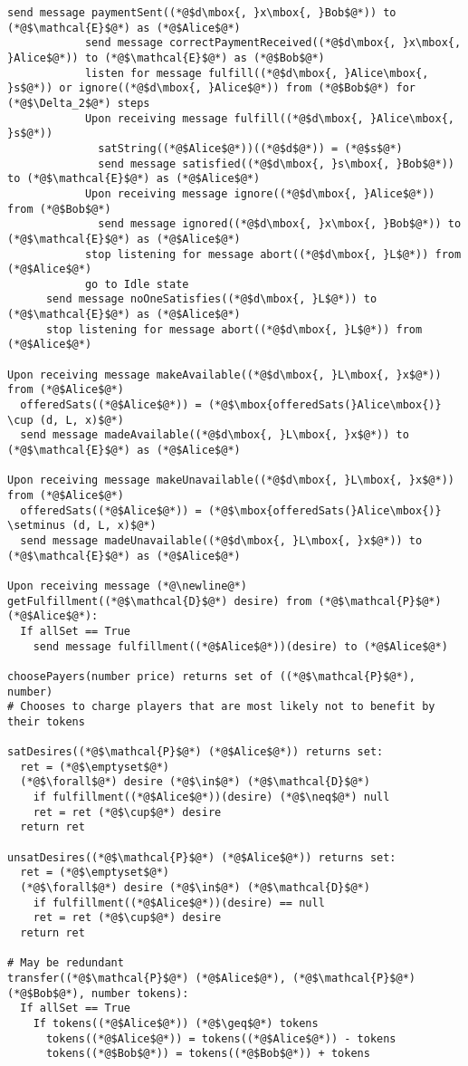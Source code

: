 \begin{lstlisting}[label=satfunc, style=numbers]
            send message paymentSent((*@$d\mbox{, }x\mbox{, }Bob$@*)) to (*@$\mathcal{E}$@*) as (*@$Alice$@*)
            send message correctPaymentReceived((*@$d\mbox{, }x\mbox{, }Alice$@*)) to (*@$\mathcal{E}$@*) as (*@$Bob$@*)
            listen for message fulfill((*@$d\mbox{, }Alice\mbox{, }s$@*)) or ignore((*@$d\mbox{, }Alice$@*)) from (*@$Bob$@*) for (*@$\Delta_2$@*) steps
            Upon receiving message fulfill((*@$d\mbox{, }Alice\mbox{, }s$@*))
              satString((*@$Alice$@*))((*@$d$@*)) = (*@$s$@*)
              send message satisfied((*@$d\mbox{, }s\mbox{, }Bob$@*)) to (*@$\mathcal{E}$@*) as (*@$Alice$@*)
            Upon receiving message ignore((*@$d\mbox{, }Alice$@*)) from (*@$Bob$@*)
              send message ignored((*@$d\mbox{, }x\mbox{, }Bob$@*)) to (*@$\mathcal{E}$@*) as (*@$Alice$@*)
            stop listening for message abort((*@$d\mbox{, }L$@*)) from (*@$Alice$@*)
            go to Idle state
      send message noOneSatisfies((*@$d\mbox{, }L$@*)) to (*@$\mathcal{E}$@*) as (*@$Alice$@*)
      stop listening for message abort((*@$d\mbox{, }L$@*)) from (*@$Alice$@*)

Upon receiving message makeAvailable((*@$d\mbox{, }L\mbox{, }x$@*)) from (*@$Alice$@*)
  offeredSats((*@$Alice$@*)) = (*@$\mbox{offeredSats(}Alice\mbox{)} \cup (d, L, x)$@*)
  send message madeAvailable((*@$d\mbox{, }L\mbox{, }x$@*)) to (*@$\mathcal{E}$@*) as (*@$Alice$@*)

Upon receiving message makeUnavailable((*@$d\mbox{, }L\mbox{, }x$@*)) from (*@$Alice$@*)
  offeredSats((*@$Alice$@*)) = (*@$\mbox{offeredSats(}Alice\mbox{)} \setminus (d, L, x)$@*)
  send message madeUnavailable((*@$d\mbox{, }L\mbox{, }x$@*)) to (*@$\mathcal{E}$@*) as (*@$Alice$@*)

Upon receiving message (*@\newline@*) getFulfillment((*@$\mathcal{D}$@*) desire) from (*@$\mathcal{P}$@*) (*@$Alice$@*):
  If allSet == True
    send message fulfillment((*@$Alice$@*))(desire) to (*@$Alice$@*)

choosePayers(number price) returns set of ((*@$\mathcal{P}$@*), number)
# Chooses to charge players that are most likely not to benefit by their tokens

satDesires((*@$\mathcal{P}$@*) (*@$Alice$@*)) returns set:
  ret = (*@$\emptyset$@*)
  (*@$\forall$@*) desire (*@$\in$@*) (*@$\mathcal{D}$@*)
    if fulfillment((*@$Alice$@*))(desire) (*@$\neq$@*) null
    ret = ret (*@$\cup$@*) desire
  return ret

unsatDesires((*@$\mathcal{P}$@*) (*@$Alice$@*)) returns set:
  ret = (*@$\emptyset$@*)
  (*@$\forall$@*) desire (*@$\in$@*) (*@$\mathcal{D}$@*)
    if fulfillment((*@$Alice$@*))(desire) == null
    ret = ret (*@$\cup$@*) desire
  return ret

# May be redundant
transfer((*@$\mathcal{P}$@*) (*@$Alice$@*), (*@$\mathcal{P}$@*) (*@$Bob$@*), number tokens):
  If allSet == True
    If tokens((*@$Alice$@*)) (*@$\geq$@*) tokens
      tokens((*@$Alice$@*)) = tokens((*@$Alice$@*)) - tokens
      tokens((*@$Bob$@*)) = tokens((*@$Bob$@*)) + tokens
\end{lstlisting}
